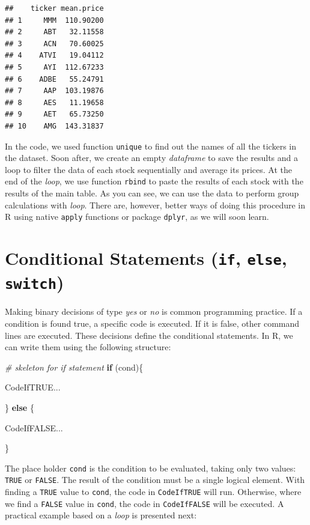 \documentclass[11pt,]{book}
\newenvironment{Shaded}{\begin{snugshade}}{\end{snugshade}}
\newcommand{\CommentTok}[1]{\textcolor[rgb]{0.56,0.35,0.01}{\textit{#1}}}
\newcommand{\ControlFlowTok}[1]{\textcolor[rgb]{0.13,0.29,0.53}{\textbf{#1}}}
\newcommand{\NormalTok}[1]{#1}
\begin{document}
\begin{verbatim}
##    ticker mean.price
## 1     MMM  110.90200
## 2     ABT   32.11558
## 3     ACN   70.60025
## 4    ATVI   19.04112
## 5     AYI  112.67233
## 6    ADBE   55.24791
## 7     AAP  103.19876
## 8     AES   11.19658
## 9     AET   65.73250
## 10    AMG  143.31837
\end{verbatim}

In the code, we used function \texttt{unique} to find out the names of
all the tickers in the dataset. Soon after, we create an empty
\emph{dataframe} to save the results and a loop to filter the data of
each stock sequentially and average its prices. At the end of the
\emph{loop}, we use function \texttt{rbind} to paste the results of each
stock with the results of the main table. As you can see, we can use the
data to perform group calculations with \emph{loop}. There are, however,
better ways of doing this procedure in R using native \texttt{apply}
functions or package \texttt{dplyr}, as we will soon learn.

\section{\texorpdfstring{Conditional Statements (\texttt{if},
\texttt{else},
\texttt{switch})}{Conditional Statements (if, else, switch)}}\label{conditional-statements-if-else-switch}

Making binary decisions of type \emph{yes} or \emph{no} is common
programming practice. If a condition is found true, a specific code is
executed. If it is false, other command lines are executed. These
decisions define the conditional statements. In R, we can write them
using the following structure:

\begin{Shaded}
\begin{Highlighting}[]
\CommentTok{# skeleton for if statement}
\ControlFlowTok{if}\NormalTok{ (cond)\{}
  
\NormalTok{  CodeIfTRUE...}
  
\NormalTok{\} }\ControlFlowTok{else}\NormalTok{ \{}
  
\NormalTok{  CodeIfFALSE...}
  
\NormalTok{\}}
\end{Highlighting}
\end{Shaded}

The place holder \texttt{cond} is the condition to be evaluated, taking
only two values: \texttt{TRUE} or \texttt{FALSE}. The result of the
condition must be a single logical element. With finding a \texttt{TRUE}
value to \texttt{cond}, the code in \texttt{CodeIfTRUE} will run.
Otherwise, where we find a \texttt{FALSE} value in \texttt{cond}, the
code in \texttt{CodeIfFALSE} will be executed. A practical example based
on a \emph{loop} is presented next: 
\end{document}
